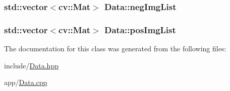 \subsubsection[{\texorpdfstring{neg\+Img\+List}{negImgList}}]{\setlength{\rightskip}{0pt plus 5cm}std\+::vector$<$cv\+::\+Mat$>$ Data\+::neg\+Img\+List}\hypertarget{classData_a64003b8f6c1cf3a3788e817a9727e5b7}{}\label{classData_a64003b8f6c1cf3a3788e817a9727e5b7}
\subsubsection[{\texorpdfstring{pos\+Img\+List}{posImgList}}]{\setlength{\rightskip}{0pt plus 5cm}std\+::vector$<$cv\+::\+Mat$>$ Data\+::pos\+Img\+List}\hypertarget{classData_a42bd07ac68b6b13b10b1e1b53a9c682c}{}\label{classData_a42bd07ac68b6b13b10b1e1b53a9c682c}


The documentation for this class was generated from the following files\+:\begin{DoxyCompactItemize}
\item 
include/\hyperlink{Data_8hpp}{Data.\+hpp}\item 
app/\hyperlink{Data_8cpp}{Data.\+cpp}\end{DoxyCompactItemize}
